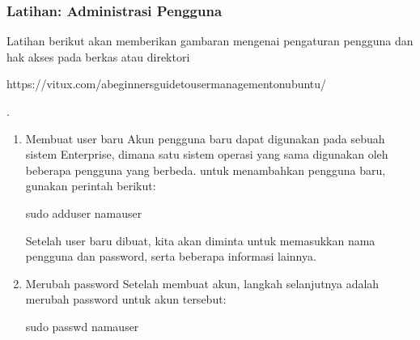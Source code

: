 \documentclass[letterpaper,10pt,english]{sphinxmanual}
\begin{document}
\subsubsection{Latihan: Administrasi Pengguna}
\label{\detokenize{sesi1/arsitektur:latihan-administrasi-pengguna}}
Latihan berikut akan memberikan gambaran mengenai pengaturan pengguna dan hak akses pada berkas atau direktori %
\begin{footnote}[3]\sphinxAtStartFootnote
https://vitux.com/a\sphinxhyphen{}beginners\sphinxhyphen{}guide\sphinxhyphen{}to\sphinxhyphen{}user\sphinxhyphen{}management\sphinxhyphen{}on\sphinxhyphen{}ubuntu/
%
\end{footnote}.
\begin{enumerate}
%
\item {} 
Membuat user baru
Akun pengguna baru dapat digunakan pada sebuah sistem Enterprise, dimana satu sistem operasi yang sama digunakan oleh beberapa pengguna yang berbeda. untuk menambahkan pengguna baru, gunakan perintah berikut:

\begin{sphinxVerbatim}[commandchars=\\\{\}]
sudo adduser namauser
\end{sphinxVerbatim}

Setelah user baru dibuat, kita akan diminta untuk memasukkan nama pengguna dan password, serta beberapa informasi lainnya.

\item {} 
Merubah password
Setelah membuat akun, langkah selanjutnya adalah merubah password untuk akun tersebut:

\begin{sphinxVerbatim}[commandchars=\\\{\}]
sudo passwd namauser
\end{sphinxVerbatim}

\end{enumerate}
\end{document}
